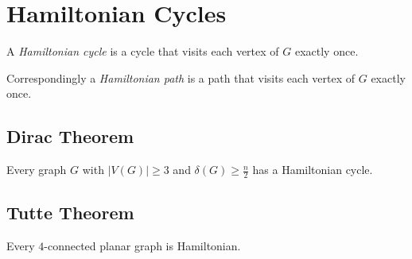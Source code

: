 \section*{Hamiltonian Cycles}

A \emph{Hamiltonian cycle} is a cycle that visits each vertex of $G$ exactly once.

Correspondingly a \emph{Hamiltonian path} is a path that visits each vertex of $G$ exactly once.

\subsection*{Dirac Theorem}

Every graph $G$ with $|V(G)| \geq 3$ and $\delta(G) \geq \frac{n}{2}$ has a Hamiltonian cycle.

\subsection*{Tutte Theorem}

Every $4$-connected planar graph is Hamiltonian.
